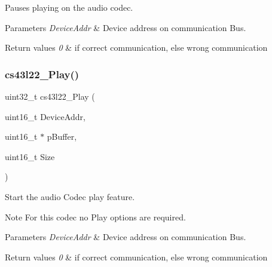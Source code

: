 Pauses playing on the audio codec. 


\begin{DoxyParams}{Parameters}
{\em Device\+Addr} & Device address on communication Bus. \\
\hline
\end{DoxyParams}

\begin{DoxyRetVals}{Return values}
{\em 0} & if correct communication, else wrong communication \\
\hline
\end{DoxyRetVals}
\mbox{\label{group___c_s43_l22___private___functions_ga1a210c3782b3d56db00565d4699f4c89}} 
\subsubsection{\texorpdfstring{cs43l22\+\_\+\+Play()}{cs43l22\_Play()}}
{\footnotesize\ttfamily uint32\+\_\+t cs43l22\+\_\+\+Play (\begin{DoxyParamCaption}\item[{uint16\+\_\+t}]{Device\+Addr,  }\item[{uint16\+\_\+t $\ast$}]{p\+Buffer,  }\item[{uint16\+\_\+t}]{Size }\end{DoxyParamCaption})}



Start the audio Codec play feature. 

\begin{DoxyNote}{Note}
For this codec no Play options are required. 
\end{DoxyNote}

\begin{DoxyParams}{Parameters}
{\em Device\+Addr} & Device address on communication Bus. ~\newline
\\
\hline
\end{DoxyParams}

\begin{DoxyRetVals}{Return values}
{\em 0} & if correct communication, else wrong communication \\
\hline
\end{DoxyRetVals}
\mbox{\label{group___c_s43_l22___private___functions_gad4e4e8b889500f0e64c546a31d4b6dca}} 
